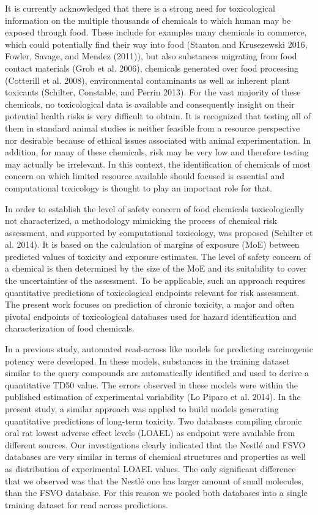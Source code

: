 \documentclass[]{achemso}
\begin{document}
It is currently acknowledged that there is a strong need for
toxicological information on the multiple thousands of chemicals to
which human may be exposed through food. These include for examples many
chemicals in commerce, which could potentially find their way into food
(Stanton and Krusezewski 2016, Fowler, Savage, and Mendez (2011)), but
also substances migrating from food contact materials (Grob et al.
2006), chemicals generated over food processing (Cotterill et al. 2008),
environmental contaminants as well as inherent plant toxicants
(Schilter, Constable, and Perrin 2013). For the vast majority of these
chemicals, no toxicological data is available and consequently insight
on their potential health risks is very difficult to obtain. It is
recognized that testing all of them in standard animal studies is
neither feasible from a resource perspective nor desirable because of
ethical issues associated with animal experimentation. In addition, for
many of these chemicals, risk may be very low and therefore testing may
actually be irrelevant. In this context, the identification of chemicals
of most concern on which limited resource available should focused is
essential and computational toxicology is thought to play an important
role for that.

In order to establish the level of safety concern of food chemicals
toxicologically not characterized, a methodology mimicking the process
of chemical risk assessment, and supported by computational toxicology,
was proposed (Schilter et al. 2014). It is based on the calculation of
margins of exposure (MoE) between predicted values of toxicity and
exposure estimates. The level of safety concern of a chemical is then
determined by the size of the MoE and its suitability to cover the
uncertainties of the assessment. To be applicable, such an approach
requires quantitative predictions of toxicological endpoints relevant
for risk assessment. The present work focuses on prediction of chronic
toxicity, a major and often pivotal endpoints of toxicological databases
used for hazard identification and characterization of food chemicals.

In a previous study, automated read-across like models for predicting
carcinogenic potency were developed. In these models, substances in the
training dataset similar to the query compounds are automatically
identified and used to derive a quantitative TD50 value. The errors
observed in these models were within the published estimation of
experimental variability (Lo Piparo et al. 2014). In the present study,
a similar approach was applied to build models generating quantitative
predictions of long-term toxicity. Two databases compiling chronic oral
rat lowest adverse effect levels (LOAEL) as endpoint were available from
different sources. Our investigations clearly indicated that the Nestlé
and FSVO databases are very similar in terms of chemical structures and
properties as well as distribution of experimental LOAEL values. The
only significant difference that we observed was that the Nestlé one has
larger amount of small molecules, than the FSVO database. For this
reason we pooled both databases into a single training dataset for read
across predictions.
\end{document}
